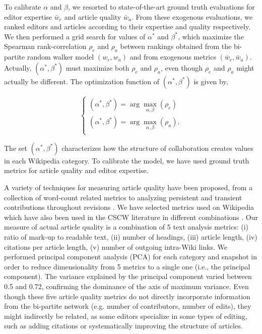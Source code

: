 To calibrate $\alpha$ and $\beta$, we resorted to state-of-the-art ground truth evaluations for editor expertise $\bar{w}_e$ and article quality $\bar{w}_a$. From these exogenous evaluations, we ranked editors and articles according to their expertise and quality respectively. We then performed  a grid search for values of $\alpha^*$ and $\beta^*$, which maximize the Spearman rank-correlation $\rho_e$ and $\rho_a$ between rankings obtained from the bi-partite random walker model $(w_e,w_a)$ and from exogenous metrics $(\bar{w}_e,\bar{w}_a)$. Actually, $(\alpha^*,\beta^*)$ must maximize both $\rho_e$ and $\rho_a$, even though $\rho_e$ and $\rho_a$ might actually be different. The optimization function  of $(\alpha^*,\beta^*)$ is given by,

\newcommand{\argmax}{\arg\!\max}

\begin{equation}
\begin{cases}
(\alpha^*,\beta^*) = \argmax_{\alpha, \beta}(\rho_e)\\
(\alpha^*,\beta^*) =\argmax_{\alpha, \beta}(\rho_a).\\
\end{cases}
\end{equation}

The set $(\alpha^*,\beta^*)$ characterizes how the structure of collaboration creates values in each Wikipedia category. To calibrate the model, we have used ground truth metrics for article quality and editor expertise. 

A variety of techniques for measuring article quality have been proposed, from a collection of word-count related metrics \cite{blumenstock2008sizematters} to analyzing persistent and transient contributions throughout revisions \cite{woehner2009}. We have selected metrics used on Wikipedia \cite{wang2013tell,klein} which have also been used in the CSCW literature in different combinations \cite{kane2011,keegan2012}. Our measure of actual article quality is a combination of 5 text analysis metrics: (i) ratio of mark-up to readable text, (ii) number of headings, (iii) article length, (iv) citations per article length, (v) number of outgoing intra-Wiki links. We performed principal component analysis (PCA) for each category and snapshot in order to reduce dimensionality from 5 metrics to a single one (i.e., the principal component). The variance explained by the principal component varied between 0.5 and 0.72, confirming the dominance of the axis of maximum variance. Even though these five article quality metrics do not directly incorporate information from the bi-partite network (e.g. number of contributors, number of edits), they might indirectly be related, as some editors specialize in some types of editing, such as adding citations or systematically improving the structure of articles.

